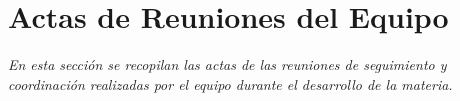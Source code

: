 \section{Actas de Reuniones del Equipo}

\begin{small}
\textit{En esta sección se recopilan las actas de las reuniones de seguimiento y coordinación realizadas por el equipo durante el desarrollo de la materia.}
\end{small}

\vspace{1em}



\newpage


